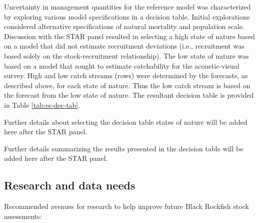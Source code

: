 \documentclass[11pt,
  english,
  letterpaper,
]{article}
\begin{document}
Uncertainty in management quantities for the reference model was characterized by exploring various model specifications in a decision table. Initial explorations considered alternative specifications of natural mortality and population scale. Discussion with the STAR panel resulted in selecting a high state of nature based on a model that did not estimate recruitment deviations (i.e., recruitment was based solely on the stock-recruitment relationship). The low state of nature was based on a model that sought to estimate catchability for the acoustic-visual survey. High and low catch streams (rows) were determined by the forecasts, as described above, for each state of nature. Thus the low catch stream is based on the forecast from the low state of nature. The resultant decision table is provided in Table \ref{tab:es-dec-tab}.



Further details about selecting the decision table states of nature will be added here after the STAR panel.

Further details summarizing the results presented in the decision table will be added here after the STAR panel.

\clearpage



\clearpage

\hypertarget{research-and-data-needs}{%
\subsection*{Research and data needs}\label{research-and-data-needs}}

Recommended avenues for research to help improve future Black Rockfish stock assessments:
\end{document}
